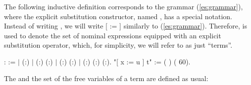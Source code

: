 The following inductive definition corresponds to the grammar (\ref{es:grammar}), where the explicit substitution constructor, named , has a special notation. Instead of writing    , we will write [ := ]  similarly to (\ref{es:grammar}). Therefore,  is used to denote the set of nominal expressions equipped with an explicit substitution operator, which, for simplicity, we will refer to as just ``terms''. 
\begin{coqdoccode}
\coqdocemptyline
\coqdocnoindent
{}  :  :=\coqdoceol
\coqdocindent{0.50em}
\ensuremath{|}  (:)\coqdoceol
\coqdocindent{0.50em}
\ensuremath{|}  (:) (:)\coqdoceol
\coqdocindent{0.50em}
\ensuremath{|}  (:) (:)\coqdoceol
\coqdocindent{0.50em}
\ensuremath{|}  (:) (:) (:).\coqdoceol
\coqdocnoindent
{} "[ x := u ] t" := (   ) (  60).\coqdoceol
\coqdocemptyline
\end{coqdoccode}
The  and the set  of the free variables of a term are defined as usual: 
